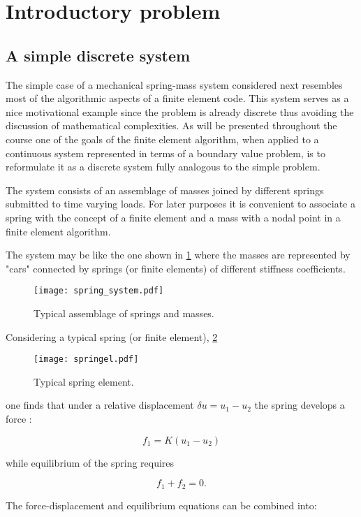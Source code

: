 \section*{Introductory problem}
\subsection*{A simple discrete system}
The simple case of a mechanical spring-mass system considered next resembles most of the algorithmic aspects of a finite element code. This system serves as a nice motivational example since the problem is already discrete thus avoiding the discussion of mathematical complexities. As will be presented throughout the course one of the goals of the finite element algorithm, when applied to a continuous system represented in terms of a boundary value problem, is to reformulate it as a discrete system fully analogous to the simple problem.

The system consists of an assemblage of masses joined by different springs submitted to time varying loads. For later purposes it is convenient to associate a spring with the concept of a finite element and a mass with a nodal point in a finite element algorithm.

The system may be like the one shown in \cref{fig:bathe} where the masses are represented by "cars" connected by springs (or finite elements) of different stiffness coefficients.

\begin{figure}[h]
\centering
\texttt{[image: spring\_system.pdf]}
\caption{Typical assemblage of springs and masses.}
\label{fig:bathe}
\end{figure}


Considering a typical spring (or finite element), \cref{fig:springel}

\begin{figure}[h]
\centering
\texttt{[image: springel.pdf]}
\caption{Typical spring element.}
\label{fig:springel}
\end{figure}

one finds that under a relative displacement $\delta u = u_1 - u_2$  the spring develops a force :

\[f_1 = K(u_1 - u_2)\]

while equilibrium of the spring requires

\[f_1 + f_2 = 0.\]

The force-displacement and equilibrium equations can be combined into:


